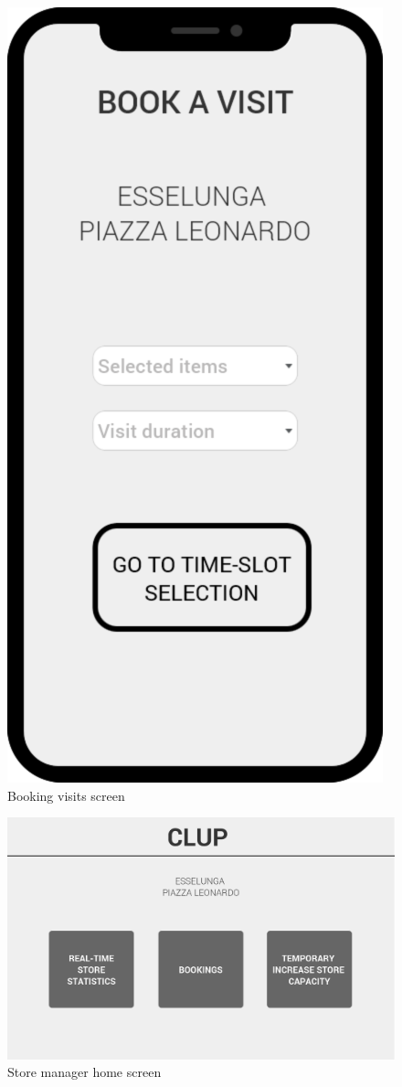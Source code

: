 \documentclass[]{article}
\begin{document}
			\begin{figure}[H]
				\centering
				\includegraphics[scale=0.3]{BookingVisitsMockup.png}
				\caption{Booking visits screen}
				\label{fig:BookingVisitsMockup}
			\end{figure}
			
			\begin{figure}[H]
				\centering
				\includegraphics[scale=0.3]{ManagerHomeMockup.png}
				\caption{Store manager home screen}
				\label{fig:ManagerHomeMockup}
			\end{figure}
		
\end{document}
